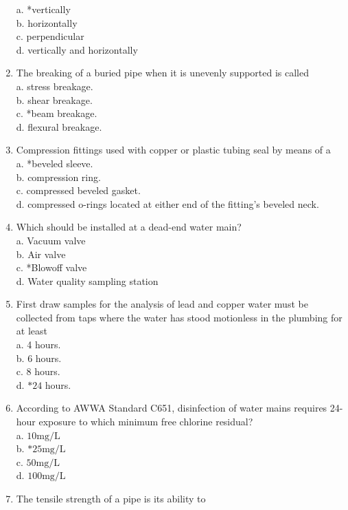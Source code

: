 \begin{enumerate}[1.]
a. *vertically\\
b. horizontally\\
c. perpendicular\\
d. vertically and horizontally\\
\item The breaking of a buried pipe when it is unevenly supported is called\\
a. stress breakage.\\
b. shear breakage.\\
c. *beam breakage.\\
d. flexural breakage.\\
\item Compression fittings used with copper or plastic tubing seal by means of a\\
a. *beveled sleeve.\\
b. compression ring.\\
c. compressed beveled gasket.\\
d. compressed o-rings located at either end of the fitting's beveled neck.\\
\item Which should be installed at a dead-end water main?\\
a. Vacuum valve\\
b. Air valve\\
c. *Blowoff valve\\
d. Water quality sampling station\\
\item First draw samples for the analysis of lead and copper water must be collected from taps where the water has stood motionless in the plumbing for at least\\
a. 4 hours.\\
b. 6 hours.\\
c. 8 hours.\\
d. $* 24$ hours.\\
\item According to AWWA Standard C651, disinfection of water mains requires 24-hour exposure to which minimum free chlorine residual?\\
a. $10 \mathrm{mg} / \mathrm{L}$\\
b. $* 25 \mathrm{mg} / \mathrm{L}$\\
c. $50 \mathrm{mg} / \mathrm{L}$\\
d. $100 \mathrm{mg} / \mathrm{L}$\\
\item The tensile strength of a pipe is its ability to\\

\end{enumerate}
